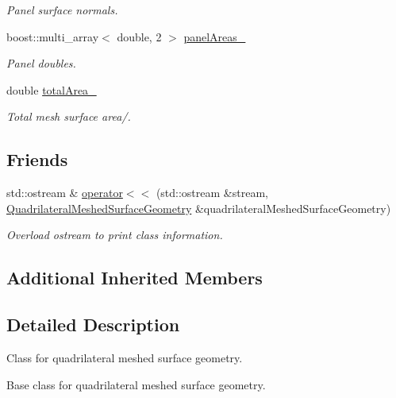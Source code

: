 \begin{DoxyCompactItemize}
\begin{DoxyCompactList}\small\item\em Panel surface normals. \end{DoxyCompactList}\item 
boost\+::multi\+\_\+array$<$ double, 2 $>$ \hyperlink{classtudat_1_1geometric__shapes_1_1QuadrilateralMeshedSurfaceGeometry_a9da840716adb5449b740250976e3111c}{panel\+Areas\+\_\+}
\begin{DoxyCompactList}\small\item\em Panel doubles. \end{DoxyCompactList}\item 
double \hyperlink{classtudat_1_1geometric__shapes_1_1QuadrilateralMeshedSurfaceGeometry_a976236e69019a26244beecb29b650112}{total\+Area\+\_\+}
\begin{DoxyCompactList}\small\item\em Total mesh surface area/. \end{DoxyCompactList}\end{DoxyCompactItemize}
\subsection*{Friends}
\begin{DoxyCompactItemize}
\item 
std\+::ostream \& \hyperlink{classtudat_1_1geometric__shapes_1_1QuadrilateralMeshedSurfaceGeometry_a4cc52bfd0487541fad05832a17d87d9a}{operator$<$$<$} (std\+::ostream \&stream, \hyperlink{classtudat_1_1geometric__shapes_1_1QuadrilateralMeshedSurfaceGeometry}{Quadrilateral\+Meshed\+Surface\+Geometry} \&quadrilateral\+Meshed\+Surface\+Geometry)
\begin{DoxyCompactList}\small\item\em Overload ostream to print class information. \end{DoxyCompactList}\end{DoxyCompactItemize}
\subsection*{Additional Inherited Members}


\subsection{Detailed Description}
Class for quadrilateral meshed surface geometry. 

Base class for quadrilateral meshed surface geometry. 

